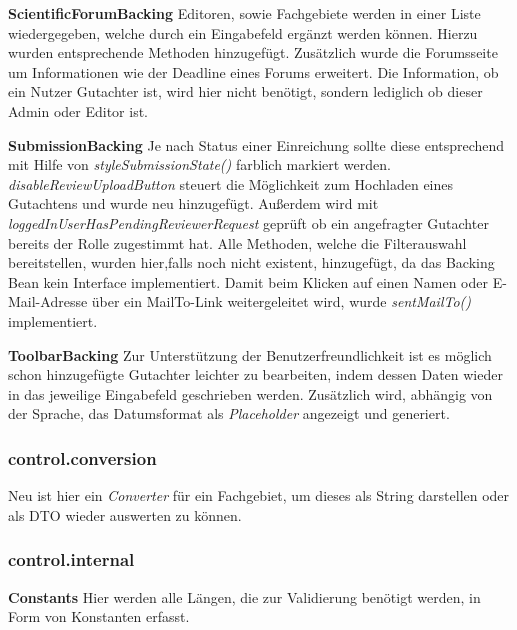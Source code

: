 \textbf{ScientificForumBacking} Editoren, sowie Fachgebiete werden in einer Liste wiedergegeben, welche durch ein Eingabefeld ergänzt werden können. Hierzu wurden entsprechende Methoden hinzugefügt. \newline
Zusätzlich wurde die Forumsseite um Informationen wie der Deadline eines Forums erweitert.\newline
Die Information, ob ein Nutzer Gutachter ist, wird hier nicht benötigt, sondern lediglich ob dieser Admin oder Editor ist.

\textbf{SubmissionBacking} Je nach Status einer Einreichung sollte diese entsprechend mit Hilfe von \emph{styleSubmissionState()} farblich markiert werden. \newline
\emph{disableReviewUploadButton} steuert die Möglichkeit zum Hochladen eines Gutachtens und wurde neu hinzugefügt. \newline Außerdem wird mit  \emph{loggedInUserHasPendingReviewerRequest} geprüft ob ein angefragter Gutachter bereits der Rolle zugestimmt hat. \newline
Alle Methoden, welche die Filterauswahl bereitstellen, wurden hier,falls noch nicht existent, hinzugefügt, da das Backing Bean kein Interface implementiert.
\newline Damit beim Klicken auf einen Namen oder E-Mail-Adresse über ein MailTo-Link weitergeleitet wird, wurde \emph{sentMailTo()} implementiert.

\textbf{ToolbarBacking} Zur Unterstützung der Benutzerfreundlichkeit ist es möglich schon hinzugefügte Gutachter leichter zu bearbeiten, indem dessen Daten wieder in das jeweilige Eingabefeld geschrieben werden. Zusätzlich wird, abhängig von der Sprache, das Datumsformat als \emph{Placeholder} angezeigt und generiert.

\subsubsection{control.conversion}

Neu ist hier ein \emph{Converter} für ein Fachgebiet, um dieses als String darstellen oder als DTO wieder auswerten zu können.

\subsubsection{control.internal}

\textbf{Constants} Hier werden alle Längen, die zur Validierung benötigt werden, in Form von Konstanten erfasst.

